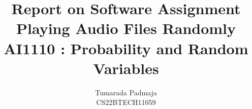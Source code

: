 \documentclass[journal,12pt,twocolumn]{IEEEtran}
\begin{document}
%


\newcommand{\BEQA}{\begin{eqnarray}}
\newcommand{\EEQA}{\end{eqnarray}}
\newcommand{\define}{\stackrel{\triangle}{=}}


%


\providecommand{\mbf}{\mathbf}
\providecommand{\pr}[1]{\ensuremath{\Pr\left(#1\right)}}
\providecommand{\qfunc}[1]{\ensuremath{Q\left(#1\right)}}
\providecommand{\sbrak}[1]{\ensuremath{{}\left[#1\right]}}
\providecommand{\lsbrak}[1]{\ensuremath{{}\left[#1\right.}}
\providecommand{\rsbrak}[1]{\ensuremath{{}\left.#1\right]}}
\providecommand{\brak}[1]{\ensuremath{\left(#1\right)}}
\providecommand{\lbrak}[1]{\ensuremath{\left(#1\right.}}
\providecommand{\rbrak}[1]{\ensuremath{\left.#1\right)}}
\providecommand{\cbrak}[1]{\ensuremath{\left\{#1\right\}}}
\providecommand{\lcbrak}[1]{\ensuremath{\left\{#1\right.}}
\providecommand{\rcbrak}[1]{\ensuremath{\left.#1\right\}}}
\theoremstyle{remark}
\newtheorem{rem}{Remark}
\newcommand{\sgn}{\mathop{\mathrm{sgn}}}
\providecommand{\abs}[1]{\left\vert#1\right\vert}
\providecommand{\res}[1]{\Res\displaylimits_{#1}} 
\providecommand{\norm}[1]{\left\lVert#1\right\rVert}
\providecommand{\mtx}[1]{\mathbf{#1}}
\providecommand{\mean}[1]{E\left[ #1 \right]}
\providecommand{\fourier}{\overset{\mathcal{F}}{ \rightleftharpoons}}
\providecommand{\system}{\overset{\mathcal{H}}{ \longleftrightarrow}}
\newcommand{\solution}{\noindent \textbf{Solution: }}
\newcommand{\cosec}{\,\text{cosec}\,}
\providecommand{\dec}[2]{\ensuremath{\overset{#1}{\underset{#2}{\gtrless}}}}
\newcommand{\myvec}[1]{\ensuremath{\begin{pmatrix}#1\end{pmatrix}}}
\newcommand{\mydet}[1]{\ensuremath{\begin{vmatrix}#1\end{vmatrix}}}

\let\vec\mathbf

\vspace{3cm}

\title{
Report on Software Assignment\\Playing Audio Files Randomly\\AI1110 : Probability and Random Variables
}
\author{Tumarada Padmaja\\CS22BTECH11059}
\end{document}

